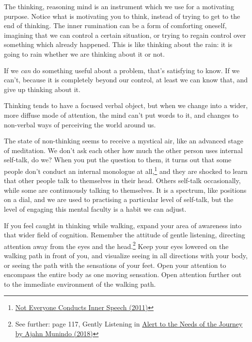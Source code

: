 The thinking, reasoning mind is an instrument which we use for a
motivating purpose. Notice what is motivating you to think, instead of
trying to get to the end of thinking. The inner rumination can be a form
of comforting oneself, imagining that we can control a certain
situation, or trying to regain control over something which already
happened. This is like thinking about the rain: it is going to rain
whether we are thinking about it or not.

If we \emph{can} do something useful about a problem, that's satisfying
to know. If we can't, because it is completely beyond our control, at
least we can know that, and give up thinking about it.

Thinking tends to have a focused verbal object, but when we change into
a wider, more diffuse mode of attention, the mind can't put words to it,
and changes to non-verbal ways of perceiving the world around us.

The state of non-thinking seems to receive a mystical air, like an
advanced stage of meditation. We don't ask each other how much the other
person uses internal self-talk, do we? When you put the question to
them, it turns out that some people don't conduct an internal monologue
at all,\footnote{\href{https://www.psychologytoday.com/us/blog/pristine-inner-experience/201110/not-everyone-conducts-inner-speech}{Not
  Everyone Conducts Inner Speech (2011)}} and they are shocked to learn
that other people talk to themselves in their head. Others self-talk
occasionally, while some are continuously talking to themselves. It is a
spectrum, like positions on a dial, and we are used to practising a
particular level of self-talk, but the level of engaging this mental
faculty is a habit we can adjust.

If you feel caught in thinking while walking, expand your area of
awareness into that wider field of cognition. Remember the attitude of
gentle listening, directing attention away from the eyes and the
head.\footnote{See further: page 117, Gently Listening in
  \href{https://forestsangha.org/teachings/books/alert-to-the-needs-of-the-journey?language=English}{Alert
  to the Needs of the Journey by Ajahn Munindo (2018)}} Keep your eyes
lowered on the walking path in front of you, and visualize seeing in all
directions with your body, or seeing the path with the sensations of
your feet. Open your attention to encompass the entire body as one
moving sensation. Open attention further out to the immediate
environment of the walking path.

